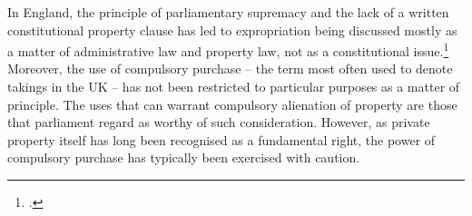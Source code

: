 


In England, the principle of parliamentary supremacy and the lack of a written constitutional property clause has led to expropriation being discussed mostly as a matter of administrative law and property law, not as a constitutional issue.\footcite{taggart98} Moreover, the use of compulsory purchase -- the term most often used to denote takings in the UK -- has not been restricted to particular purposes as a matter of principle. The uses that can warrant compulsory alienation of property are those that parliament regard as worthy of such consideration. However, as private property itself has long been recognised as a fundamental right, the power of compulsory purchase has typically been exercised with caution. 

